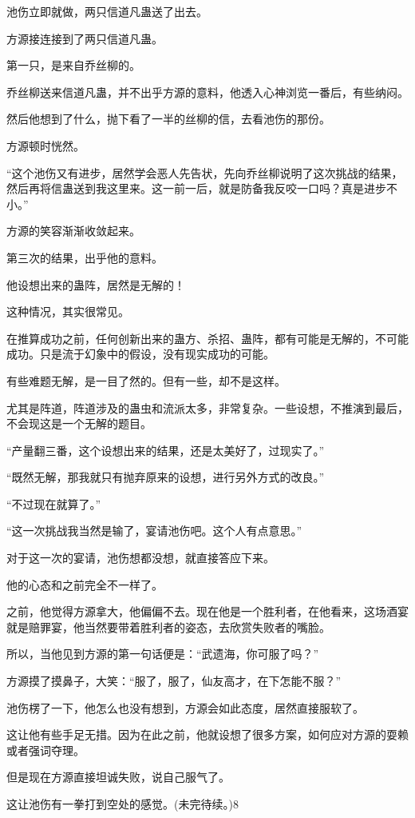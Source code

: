 \begin{this_body}
池伤立即就做，两只信道凡蛊送了出去。

方源接连接到了两只信道凡蛊。

第一只，是来自乔丝柳的。

乔丝柳送来信道凡蛊，并不出乎方源的意料，他透入心神浏览一番后，有些纳闷。

然后他想到了什么，抛下看了一半的丝柳的信，去看池伤的那份。

方源顿时恍然。

“这个池伤又有进步，居然学会恶人先告状，先向乔丝柳说明了这次挑战的结果，然后再将信蛊送到我这里来。这一前一后，就是防备我反咬一口吗？真是进步不小。”

方源的笑容渐渐收敛起来。

第三次的结果，出乎他的意料。

他设想出来的蛊阵，居然是无解的！

这种情况，其实很常见。

在推算成功之前，任何创新出来的蛊方、杀招、蛊阵，都有可能是无解的，不可能成功。只是流于幻象中的假设，没有现实成功的可能。

有些难题无解，是一目了然的。但有一些，却不是这样。

尤其是阵道，阵道涉及的蛊虫和流派太多，非常复杂。一些设想，不推演到最后，不会现这是一个无解的题目。

“产量翻三番，这个设想出来的结果，还是太美好了，过现实了。”

“既然无解，那我就只有抛弃原来的设想，进行另外方式的改良。”

“不过现在就算了。”

“这一次挑战我当然是输了，宴请池伤吧。这个人有点意思。”

对于这一次的宴请，池伤想都没想，就直接答应下来。

他的心态和之前完全不一样了。

之前，他觉得方源拿大，他偏偏不去。现在他是一个胜利者，在他看来，这场酒宴就是赔罪宴，他当然要带着胜利者的姿态，去欣赏失败者的嘴脸。

所以，当他见到方源的第一句话便是：“武遗海，你可服了吗？”

方源摸了摸鼻子，大笑：“服了，服了，仙友高才，在下怎能不服？”

池伤楞了一下，他怎么也没有想到，方源会如此态度，居然直接服软了。

这让他有些手足无措。因为在此之前，他就设想了很多方案，如何应对方源的耍赖或者强词夺理。

但是现在方源直接坦诚失败，说自己服气了。

这让池伤有一拳打到空处的感觉。(未完待续。)8

\end{this_body}

